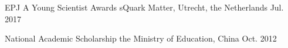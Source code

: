 



\begin{cvhonors}
  \cvhonor
    {EPJ A Young Scientist Awards} %
    {sQuark Matter, Utrecht, the Netherlands} %
    { } %
    {Jul. 2017} %


  \cvhonor
    {National Academic Scholarship } %
    {the Ministry of Education, China} %
    { } %
    {Oct. 2012} %





\end{cvhonors}

